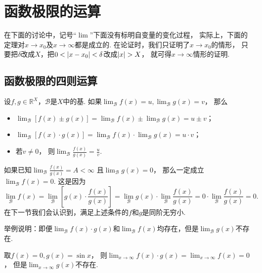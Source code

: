 \section{函数极限的运算}
在下面的讨论中，记号“\(\lim\)”下面没有标明自变量的变化过程，
实际上，下面的定理对\(x \to x_0\)及\(x \to \infty\)都是成立的.
在论证时，我们只证明了\(x \to x_0\)的情形，
只要把\(\delta\)改成\(X\)，把\(0<\abs{x-x_0}<\delta\)改成\(\abs{x}>X\)，
就可得\(x\to\infty\)情形的证明.

\subsection{函数极限的四则运算}
\begin{theorem}\label{theorem:极限.极限的四则运算法则}
设\(f,g\in\mathbb{R}^X\)，\(\mathcal{B}\)是\(X\)中的基.
如果\(\lim_\mathcal{B} f(x) = u,
\lim_\mathcal{B} g(x) = v\)，
那么\begin{itemize}
	\item \(\lim_\mathcal{B} [f(x) \pm g(x)]
	= \lim_\mathcal{B} f(x) \pm \lim_\mathcal{B} g(x)
	= u \pm v\)；

	\item \(\lim_\mathcal{B} [f(x) \cdot g(x)]
	= \lim_\mathcal{B} f(x) \cdot \lim_\mathcal{B} g(x)
	= u \cdot v\)；

	\item 若\(v\neq0\)，
	则\(\lim_\mathcal{B} \frac{f(x)}{g(x)} = \frac{u}{v}\).
\end{itemize}
\end{theorem}
\begin{remark}
如果已知\(\lim_\mathcal{B} \frac{f(x)}{g(x)} = A < \infty\)
且\(\lim_\mathcal{B} g(x) = 0\)，
那么一定成立\(\lim_\mathcal{B} f(x) = 0\).
这是因为\[
	\lim_\mathcal{B} f(x)
	= \lim_\mathcal{B} \left[
			g(x) \cdot \frac{f(x)}{g(x)}
		\right]
	= \lim_\mathcal{B} g(x) \cdot \lim_\mathcal{B} \frac{f(x)}{g(x)}
	= 0 \cdot \lim_\mathcal{B} \frac{f(x)}{g(x)} = 0.
\]
在下一节我们会认识到，满足上述条件的\(f\)和\(g\)是同阶无穷小.
\end{remark}
\begin{example}
举例说明：即便\(\lim_\mathcal{B} f(x) \cdot g(x)\)和\(\lim_\mathcal{B} f(x)\)均存在，但是\(\lim_\mathcal{B} g(x)\)不存在.
\begin{solution}
取\(f(x) = 0,
g(x) = \sin x\)，
则\(\lim_{x\to\infty} f(x) \cdot g(x)
= \lim_{x\to\infty} f(x)
= 0\)，
但是\(\lim_{x\to\infty} g(x)\)不存在.
\end{solution}
\end{example}


